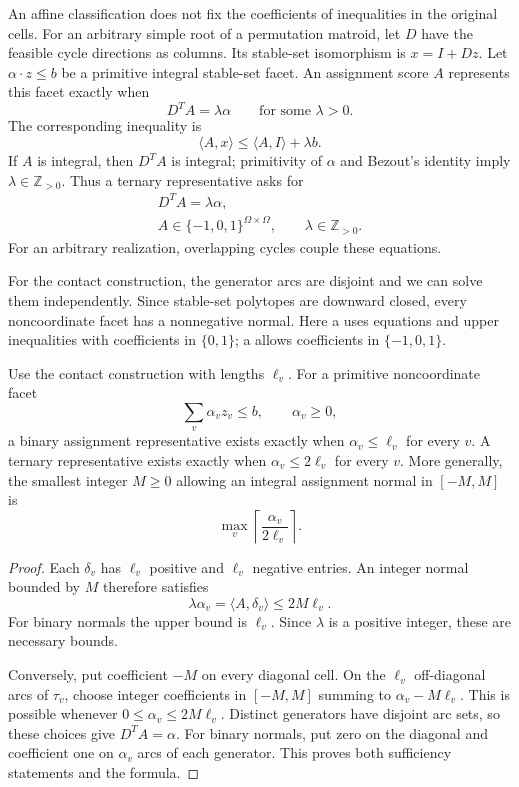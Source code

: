 An affine classification does not fix the coefficients of inequalities
in the original cells. For an arbitrary simple root of a permutation
matroid, let $D$ have the feasible cycle directions as columns.
Its stable-set isomorphism is $x=I+Dz$. Let
$\alpha\cdot z\leq b$ be a primitive integral stable-set facet.
An assignment score $A$ represents this facet exactly when
\[
 D^TA=\lambda\alpha\qquad\text{for some }\lambda>0.
\]
The corresponding inequality is
\[
 \langle A,x\rangle
 \leq\langle A,I\rangle+\lambda b.
\]
If $A$ is integral, then $D^TA$ is integral; primitivity of $\alpha$
and Bezout's identity imply $\lambda\in\mathbb Z_{>0}$.
Thus a ternary representative asks for
\[
 \begin{gathered}
 D^TA=\lambda\alpha,\\
 A\in\{-1,0,1\}^{\Omega\times\Omega},\qquad
 \lambda\in\mathbb Z_{>0}.
 \end{gathered}
\]
For an arbitrary realization, overlapping cycles couple these equations.

For the contact construction, the generator arcs are disjoint and we
can solve them independently. Since stable-set polytopes are downward
closed, every noncoordinate facet has a nonnegative normal.
Here a  uses
equations and upper inequalities with coefficients in $\{0,1\}$;
a  allows coefficients in $\{-1,0,1\}$.

\begin{theorem}
Use the contact construction with lengths $\ell_v$.
For a primitive noncoordinate facet
\[
 \sum_v\alpha_v z_v\leq b,\qquad \alpha_v\geq0,
\]
a binary assignment representative exists exactly when
$\alpha_v\leq\ell_v$ for every $v$. A ternary representative exists
exactly when $\alpha_v\leq2\ell_v$ for every $v$.
More generally, the smallest integer $M\geq0$ allowing an integral assignment
normal in $[-M,M]$ is
\[
 \max_v\left\lceil\frac{\alpha_v}{2\ell_v}\right\rceil.
\]
\end{theorem}

\begin{proof}
Each $\delta_v$ has $\ell_v$ positive and $\ell_v$ negative entries.
An integer normal bounded by $M$ therefore satisfies
\[
 \lambda\alpha_v=\langle A,\delta_v\rangle
 \leq2M\ell_v.
\]
For binary normals the upper bound is $\ell_v$. Since $\lambda$
is a positive integer, these are necessary bounds.

Conversely, put coefficient $-M$ on every diagonal cell. On the
$\ell_v$ off-diagonal arcs of $\tau_v$, choose integer coefficients
in $[-M,M]$ summing to $\alpha_v-M\ell_v$. This is possible whenever
$0\leq\alpha_v\leq2M\ell_v$. Distinct generators have disjoint arc
sets, so these choices give $D^TA=\alpha$. For binary normals, put
zero on the diagonal and coefficient one on $\alpha_v$ arcs of
each generator. This proves both sufficiency statements and the formula.
\end{proof}

